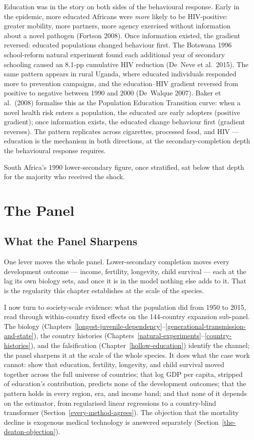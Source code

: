 \documentclass[12pt,letterpaper]{article}
\begin{document}
Education was in the story on both sides of the behavioural response.
Early in the epidemic, more educated Africans were \emph{more} likely
to be HIV-positive: greater mobility, more partners, more agency
exercised without information about a novel pathogen (Fortson 2008).
Once information existed, the gradient reversed: educated populations
changed behaviour first. The Botswana 1996 school-reform natural
experiment found each additional year of secondary schooling caused
an 8.1-pp cumulative HIV reduction (De~Neve et al.~2015). The same pattern
appears in rural Uganda, where educated individuals responded more
to prevention campaigns, and the
education--HIV gradient reversed from positive to negative between
1990 and 2000 (De~Walque 2007). Baker et al.\ (2008) formalise this
as the Population Education Transition curve: when a novel health risk
enters a population, the educated are early adopters (positive
gradient); once information exists, the educated change behaviour
first (gradient reverses). The pattern replicates across cigarettes,
processed food, and HIV --- education is the mechanism in both
directions, at the secondary-completion depth the behavioural response
requires.

South Africa's 1990 lower-secondary figure, once stratified, sat
below that depth for the majority who received the shock.

\section{The Panel}\label{the-panel}

\subsection{What the Panel Sharpens}\label{what-the-panel-sharpens}

One lever moves the whole panel. Lower-secondary completion moves
every development outcome --- income, fertility, longevity, child
survival --- each at the lag its own biology sets, and once it is in
the model nothing else adds to it. That is the regularity this chapter
establishes at the scale of the species.

I now turn to society-scale evidence: what the population did from
1950 to 2015, read through within-country fixed effects on the
144-country expansion sub-panel. The biology
(Chapters~\ref{longest-juvenile-dependency}--\ref{generational-transmission-and-state}),
the country histories
(Chapters~\ref{natural-experiments}--\ref{country-histories}), and the
falsification (Chapter~\ref{hollow-education}) identify the channel;
the panel sharpens it at the scale of the whole species. It does what
the case work cannot: show that education, fertility, longevity, and
child survival moved together across the full universe of countries;
that log GDP per capita, stripped of education's contribution, predicts
none of the development outcomes; that the pattern holds in every
region, era, and income band; and that none of it depends on the
estimator, from regularised linear regressions to a country-blind
transformer (Section~\ref{every-method-agrees}). The objection that the
mortality decline is exogenous medical technology is answered
separately (Section~\ref{the-deaton-objection}).
\end{document}

